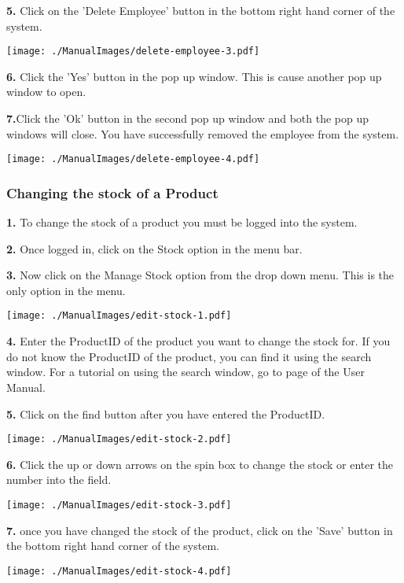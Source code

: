 \textbf{5.} Click on the 'Delete Employee' button in the bottom right hand corner of the system.

\texttt{[image: ./ManualImages/delete-employee-3.pdf]}

\textbf{6.} Click the 'Yes' button in the pop up window. This is cause another pop up window to open.

\textbf{7.}Click the 'Ok' button in the second pop up window and both the pop up windows will close. You have successfully removed the employee from the system.

\texttt{[image: ./ManualImages/delete-employee-4.pdf]}

\pagebreak
\subsubsection{Changing the stock of a Product}
\label{fig:Changing the stock of a Product}

\textbf{1.} To change the stock of a product you must be logged into the system.

\textbf{2.} Once logged in, click on the Stock option in the menu bar.

\textbf{3.} Now click on the Manage Stock option from the drop down menu. This is the only option in the menu.

\texttt{[image: ./ManualImages/edit-stock-1.pdf]}

\textbf{4.} Enter the ProductID of the product you want to change the stock for. If you do not know the ProductID of the product, you can find it using the search window. For a tutorial on using the search window, go to page \pageref{fig:Using the search window} of the User Manual.

\textbf{5.} Click on the find button after you have entered the ProductID.

\texttt{[image: ./ManualImages/edit-stock-2.pdf]}

\textbf{6.} Click the up or down arrows on the spin box to change the stock or enter the number into the field.

\texttt{[image: ./ManualImages/edit-stock-3.pdf]}

\textbf{7.} once you have changed the stock of the product, click on the 'Save' button in the bottom right hand corner of the system.

\texttt{[image: ./ManualImages/edit-stock-4.pdf]}

